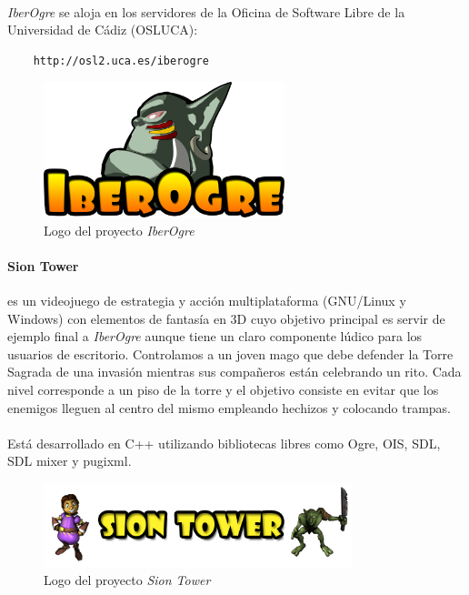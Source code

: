 \documentclass[16pt,spanish]{article}
\def \juego{\emph {Sion Tower} }
\def \wiki{\emph{IberOgre} }
\begin{document}
\paragraph{}
\wiki se aloja en los servidores de la Oficina de Software Libre de la
Universidad de Cádiz (OSLUCA):

\begin{verbatim}
    http://osl2.uca.es/iberogre
\end{verbatim}

\begin{figure}[H]
    \centering
        \includegraphics[width=7cm]{img/iberogre.png} 
    \caption{Logo del proyecto \wiki}
    \label{img:logo-iberogre}
\end{figure}

\paragraph{Sion Tower}
es un videojuego de estrategia y acción multiplataforma (GNU/Linux y Windows)
con elementos de fantasía en 3D cuyo objetivo principal es servir
de ejemplo final a \wiki aunque tiene un claro componente lúdico para los
usuarios de escritorio. Controlamos a un joven mago que debe defender
la Torre Sagrada de una invasión mientras sus compañeros están celebrando
un rito. Cada nivel corresponde a un piso de la torre y el objetivo consiste
en evitar que los enemigos lleguen al centro del mismo empleando hechizos
y colocando trampas.

\paragraph{}
Está desarrollado en C++ utilizando bibliotecas libres como Ogre, OIS, SDL,
SDL mixer y pugixml. 

\begin{figure}[H]
    \centering
        \includegraphics[width=9cm]{img/siontower.png} 
    \caption{Logo del proyecto \juego}
    \label{img:logo-siontower}
\end{figure}
\end{document}
